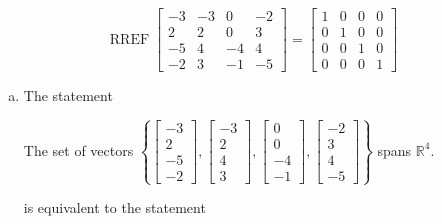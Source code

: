 \begin{exerciseAnswer} 


\[\operatorname{RREF} \left[\begin{array}{cccc}
-3 & -3 & 0 & -2 \\
2 & 2 & 0 & 3 \\
-5 & 4 & -4 & 4 \\
-2 & 3 & -1 & -5
\end{array}\right] = \left[\begin{array}{cccc}
1 & 0 & 0 & 0 \\
0 & 1 & 0 & 0 \\
0 & 0 & 1 & 0 \\
0 & 0 & 0 & 1
\end{array}\right] \]


\begin{enumerate}[(a)]
\item The statement 
\begin{center}\begin{minipage}{0.8\textwidth}
 The set of vectors \( \left\{ \left[\begin{array}{c}
-3 \\
2 \\
-5 \\
-2
\end{array}\right] , \left[\begin{array}{c}
-3 \\
2 \\
4 \\
3
\end{array}\right] , \left[\begin{array}{c}
0 \\
0 \\
-4 \\
-1
\end{array}\right] , \left[\begin{array}{c}
-2 \\
3 \\
4 \\
-5
\end{array}\right] \right\} \) spans \(\mathbb{R}^4\). 
\end{minipage}\end{center}
     is equivalent to the statement 
\begin{center}\begin{minipage}{0.8\textwidth}
 The vector equation \( x_{1} \left[\begin{array}{c}
-3 \\
2 \\

\end{array}
\end{minipage}
\end{center}
\end{enumerate}
\end{exerciseAnswer}
